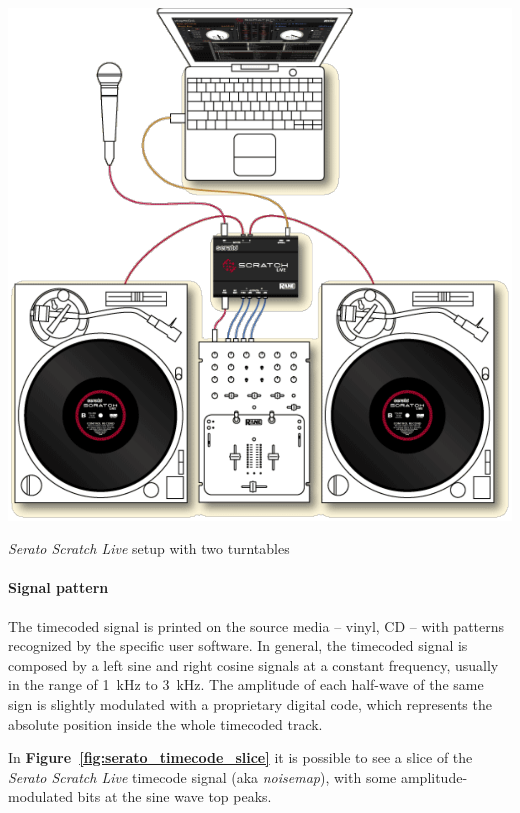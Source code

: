 \documentclass[a4paper,10pt]{article}
\makeatletter
\newenvironment{figurehere}{\def\@captype{figure}\vspace{2ex}}{\vspace{2ex}}
\makeatother
\begin{document}
\begin{multicols}{2}
\begin{figurehere}
	\label{fig:serato_setup}
	\centering
	\includegraphics[keepaspectratio=true,width=0.9\columnwidth]{images/serato_setup.pdf}
	\caption{\emph{Serato Scratch Live} setup with two turntables}
\end{figurehere}


\paragraph{Signal pattern}
The timecoded signal is printed on the source media -- vinyl, CD -- with
patterns recognized by the specific user software. In general, the timecoded
signal is composed by a left sine and right cosine signals at a constant
frequency, usually in the range of 1~kHz to 3~kHz. The amplitude of each
half-wave of the same sign is slightly modulated with a proprietary digital
code, which represents the absolute position inside the whole timecoded track.

In \textbf{Figure~\ref{fig:serato_timecode_slice}} it is possible to see a
slice of the \emph{Serato Scratch Live}\cite{rane_ssl} timecode signal
(aka \emph{noisemap}), with some amplitude-modulated bits at the sine wave
top peaks.


\end{multicols}
\end{document}
